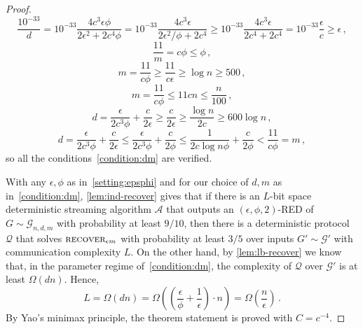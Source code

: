 \documentclass[epsfig,letter,11pt]{article}
\numberwithin{equation}{section}
\DeclareMathOperator*{\recover}{\textsc{recover}}
\begin{document}
\begin{proof}
\begin{equation*}
	\frac{10^{-33}}{d} = 10^{-33}\frac{4c^3\epsilon\phi}{2\epsilon^2 + 2c^4\phi}=10^{-33}\frac{4c^3\epsilon}{2\epsilon^2/\phi + 2c^4} \ge 10^{-33}\frac{4c^3\epsilon}{2c^4 + 2c^4} = 10^{-33} \frac{\epsilon}{c} \ge \epsilon \, ,
\end{equation*}
\begin{equation*}
	\frac{11}{m} = c{\phi} \le \phi \, ,
\end{equation*}
\begin{equation*}
	m = \frac{11}{c \phi} \ge \frac{11}{c \epsilon}  \ge \log n \ge 500 \, ,
\end{equation*}
\begin{equation*}
	m = \frac{11}{c \phi} \le 11 c n \le \frac{n}{100}\, ,
\end{equation*}
\begin{equation*}
	d = \frac{\epsilon}{2c^3 \phi } + \frac{c}{2 \epsilon} \ge \frac{c}{2 \epsilon}  \ge \frac{\log n}{2c} \ge 600 \log n \, ,
\end{equation*}
\begin{equation*}
	d = \frac{\epsilon}{2c^3 \phi } + \frac{c}{2 \epsilon} \le \frac{\epsilon}{2c^3 \phi } + \frac{c}{2 \phi}  \le \frac{1}{2c \log n \phi } + \frac{c}{2 \phi}  < \frac{11}{c \phi} = m \, ,
\end{equation*}
so all the conditions~\eqref{condition:dm} are verified.
	
	With any $\epsilon,\phi$ as in~\eqref{setting:epsphi} and for our choice of $d,m$ as in~\eqref{condition:dm}, \cref{lem:ind-recover} gives that if there is an $L$-bit space deterministic streaming algorithm $\mathcal{A}$ that outputs an $(\epsilon,\phi,2)$-RED of $G \sim \mathcal{G}_{n,d,m}$ with probability at least $9/10$, then there is a deterministic protocol $\mathcal{Q}$ that solves $\recover_{\epsilon m}$ with probability at least $3/5$ over inputs $G' \sim \mathcal{G}'$ with communication complexity $L$. On the other hand, by \cref{lem:lb-recover} we know that, in the parameter regime of~\eqref{condition:dm}, the complexity of $\mathcal{Q}$ over $ \mathcal{G}'$ is at least $\Omega(dn)$. Hence,
	\begin{equation*}
		L = \Omega(dn)  = \Omega\left(\left(\frac{\epsilon}{\phi}+\frac{1}{\epsilon}\right) \cdot n \right) = \Omega\left(\frac{n}{\epsilon}\right)\, .
	\end{equation*}
 	By Yao's minimax principle, the theorem statement is proved with $C = c^{-4}$.
	
\end{proof}
\end{document}
